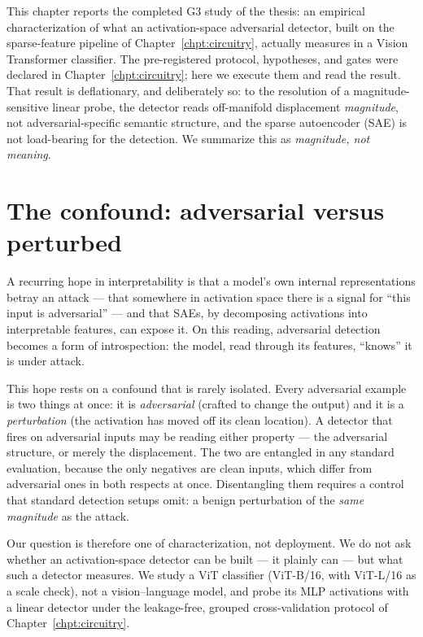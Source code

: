 \documentclass[../ppgc-tese.tex]{subfiles}
\begin{document}
This chapter reports the completed G3 study of the thesis: an empirical
characterization of what an activation-space adversarial detector, built on the
sparse-feature pipeline of Chapter~\ref{chpt:circuitry}, actually measures in a
Vision Transformer classifier. The pre-registered protocol, hypotheses, and gates
were declared in Chapter~\ref{chpt:circuitry}; here we execute them and read the
result. That result is deflationary, and deliberately so: to the resolution of a
magnitude-sensitive linear probe, the detector reads off-manifold displacement
\emph{magnitude}, not adversarial-specific semantic structure, and the sparse
autoencoder (SAE) is not load-bearing for the detection. We summarize this as
\emph{magnitude, not meaning}.

\section{The confound: adversarial versus perturbed}
\label{sec:adv-confound}
A recurring hope in interpretability is that a model's own internal
representations betray an attack --- that somewhere in activation space there is a
signal for ``this input is adversarial'' --- and that SAEs, by decomposing
activations into interpretable features, can expose it. On this reading,
adversarial detection becomes a form of introspection: the model, read through its
features, ``knows'' it is under attack.

This hope rests on a confound that is rarely isolated. Every adversarial example is
two things at once: it is \emph{adversarial} (crafted to change the output) and it
is a \emph{perturbation} (the activation has moved off its clean location). A
detector that fires on adversarial inputs may be reading either property --- the
adversarial structure, or merely the displacement. The two are entangled in any
standard evaluation, because the only negatives are clean inputs, which differ from
adversarial ones in both respects at once. Disentangling them requires a control
that standard detection setups omit: a benign perturbation of the \emph{same
magnitude} as the attack.

Our question is therefore one of characterization, not deployment. We do not ask
whether an activation-space detector can be built --- it plainly can --- but what
such a detector measures. We study a ViT classifier (ViT-B/16, with ViT-L/16 as a
scale check), not a vision--language model, and probe its MLP activations with a
linear detector under the leakage-free, grouped cross-validation protocol of
Chapter~\ref{chpt:circuitry}.
\end{document}
